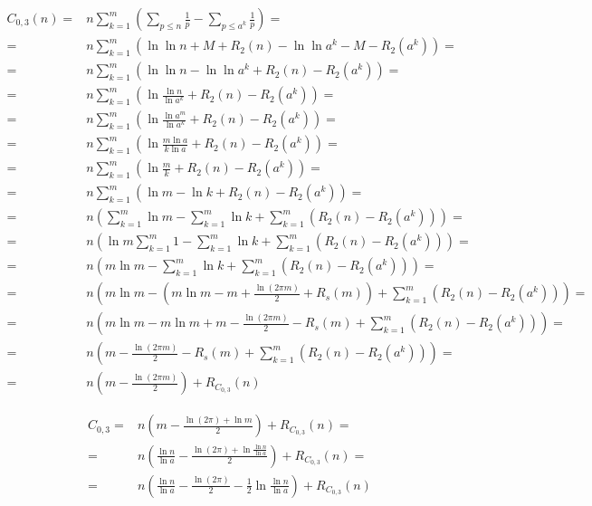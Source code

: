 \documentclass{article}
\begin{document}
\begin{align*}
C_{0,3}(n) =& n \sum_{k=1}^{m} \left( \sum_{p \le n} \frac{1}{p} - \sum_{p \le a^k} \frac{1}{p} \right) = \\
=& n \sum_{k=1}^{m} \left( \ln{\ln{n}} + M + R_2(n) - \ln{\ln{a^k}} - M - R_2(a^k) \right) = \\
=& n \sum_{k=1}^{m} \left( \ln{\ln{n}} - \ln{\ln{a^k}} + R_2(n) - R_2(a^k) \right) = \\
=& n \sum_{k=1}^{m} \left( \ln{\frac{\ln{n}}{\ln{a^k}}} + R_2(n) - R_2(a^k) \right) = \\
=& n \sum_{k=1}^{m} \left( \ln{\frac{\ln{a^m}}{\ln{a^k}}} + R_2(n) - R_2(a^k) \right) = \\
=& n \sum_{k=1}^{m} \left( \ln{\frac{m \ln{a}}{k \ln{a}}} + R_2(n) - R_2(a^k) \right) = \\
=& n \sum_{k=1}^{m} \left( \ln{\frac{m}{k}} + R_2(n) - R_2(a^k) \right) = \\
=& n \sum_{k=1}^{m} \left( \ln{m} - \ln{k} + R_2(n) - R_2(a^k) \right) = \\
=& n \left( \sum_{k=1}^{m} \ln{m} - \sum_{k=1}^{m} \ln{k} + \sum_{k=1}^{m} \left( R_2(n) - R_2(a^k) \right) \right) = \\
=& n \left( \ln{m} \sum_{k=1}^{m} 1 - \sum_{k=1}^{m} \ln{k} + \sum_{k=1}^{m} \left( R_2(n) - R_2(a^k) \right) \right) = \\
=& n \left( m \ln{m} - \sum_{k=1}^{m} \ln{k} + \sum_{k=1}^{m} \left( R_2(n) - R_2(a^k) \right) \right) = \\
=& n \left( m \ln{m} - \left( m \ln{m} - m + \frac{\ln{(2 \pi m)}}{2} + R_s(m) \right) + \sum_{k=1}^{m} \left( R_2(n) - R_2(a^k) \right) \right) = \\
=& n \left( m \ln{m} - m \ln{m} + m - \frac{\ln{(2 \pi m)}}{2} - R_s(m) + \sum_{k=1}^{m} \left( R_2(n) - R_2(a^k) \right) \right) = \\
=& n \left( m- \frac{\ln{(2 \pi m)}}{2} - R_s(m) + \sum_{k=1}^{m} \left( R_2(n) - R_2(a^k) \right) \right) = \\
=& n \left( m - \frac{\ln{(2 \pi m)}}{2} \right) + R_{C_{0,3}}(n)
\end{align*}

\begin{align*}
C_{0,3} =& n \left( m - \frac{\ln{(2 \pi) + \ln{m}}}{2} \right) + R_{C_{0,3}}(n) = \\
=& n \left( \frac{\ln{n}}{\ln{a}} - \frac{\ln{(2 \pi)} + \ln{\frac{\ln{n}}{\ln{a}}}}{2} \right) + R_{C_{0,3}}(n) = \\
=& n \left( \frac{\ln{n}}{\ln{a}} - \frac{\ln{(2 \pi)}}{2} - \frac{1}{2} \ln{\frac{\ln{n}}{\ln{a}}} \right) + R_{C_{0,3}}(n)
\end{align*}
\end{document}
